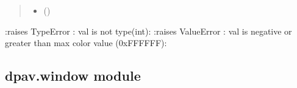 \documentclass[letterpaper,10pt,english]{sphinxmanual}
\begin{document}
\begin{fulllineitems}
\begin{fulllineitems}
\begin{quote}
\begin{description}
\begin{itemize}
\item {} 
\sphinxAtStartPar
{} () \textendash{} 

\end{itemize}

\end{description}\end{quote}

\sphinxAtStartPar
:raises TypeError : val is not type(int):
:raises ValueError : val is negative or greater than max color value (0xFFFFFF):

\end{fulllineitems}


\end{fulllineitems}



\subsection{dpav.window module}
\label{\detokenize{dpav:module-dpav.window}}\label{\detokenize{dpav:dpav-window-module}}
\end{document}

